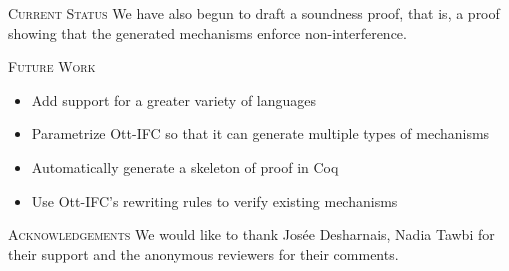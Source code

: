 \documentclass[final]{beamer}
\newlength{\onecolwid}
\begin{document}
\begin{frame}[fragile]
\begin{columns}[t]
\begin{column}{\onecolwid}
\begin{block}{\textsc{Current Status}}
We have also begun to draft a soundness proof, that is, a proof showing that the generated mechanisms enforce non-interference.


\end{block}

\begin{block}{\textsc{Future Work}}
    \begin{itemize}
        \item Add support for a greater variety of languages
        \item Parametrize Ott-IFC so that it can generate multiple types of mechanisms
        \item Automatically generate a skeleton of proof in Coq
        \item Use Ott-IFC's rewriting rules to verify existing mechanisms
    \end{itemize}
\end{block}

\begin{block}{\textsc{Acknowledgements}}
    We would like to thank Josée Desharnais, Nadia Tawbi for their support and the anonymous reviewers for their comments.    
\end{block}

%    
%    
\end{column}
\end{columns}
\end{frame}
\end{document}
